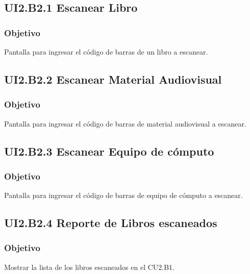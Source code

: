 \newpage
\subsection{UI2.B2.1 Escanear Libro}

\subsubsection{Objetivo}
	Pantalla para ingresar el código de barras de un libro a escanear.


\subsection{UI2.B2.2 Escanear Material Audiovisual}

\subsubsection{Objetivo}
	Pantalla para ingresar el código de barras de material audiovisual a escanear.


\subsection{UI2.B2.3 Escanear Equipo de cómputo}

\subsubsection{Objetivo}
	Pantalla para ingresar el código de barras de equipo de cómputo a escanear.


\subsection{UI2.B2.4 Reporte de Libros escaneados}

\subsubsection{Objetivo}
Mostrar la lista de los libros escaneados en el CU2.B1.


